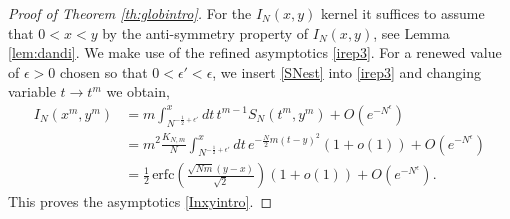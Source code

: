 \documentclass[11pt,reqno]{amsproc}
\numberwithin{equation}{section}
\numberwithin{theorem}{section}
\begin{document}
\begin{proof}[Proof of Theorem \ref{th:globintro}]
For the $I_{N}(x,y)$ kernel it suffices to assume that $0 < x < y$ by the anti-symmetry property of $I_{N}(x,y)$, see Lemma \ref{lem:dandi}. We make use of the refined asymptotics \eqref{irep3}. For a renewed value of $\epsilon>0$ chosen so that $0 < \epsilon' < \epsilon$, we insert \eqref{SNest} into \eqref{irep3} and changing variable $t \to t^{m}$ we obtain,
\begin{align}
I_{N}(x^{m},y^{m}) &= m\int_{N^{-\frac{1}{2}+\epsilon'}}^{x}dt\,t^{m-1}S_{N}(t^{m},y^{m})+O(e^{-N^{\epsilon}})\\
&= m^{2}\frac{K_{N,m}}{N}\int_{N^{-\frac{1}{2}+\epsilon'}}^{x}dt\,e^{-\frac{N}{2}m(t-y)^{2}}(1+o(1)) + O(e^{-N^{\epsilon}})\\
&= \frac{1}{2}\,\mathrm{erfc}\left(\frac{\sqrt{Nm}(y-x)}{\sqrt{2}}\right)(1+o(1)) + O(e^{-N^{\epsilon}}).
\end{align}
This proves the asymptotics \eqref{Inxyintro}. 


\end{proof}
\end{document}
